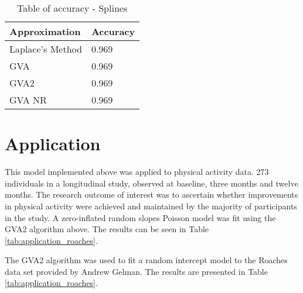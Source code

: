 \documentclass{article}[12pt]
\begin{document}
\begin{table}
\caption{Table of accuracy - Splines}
\label{tab:accuracy_spline}
\begin{tabular}{l|l}
\hline
Approximation & Accuracy \\
\hline
Laplace's Method & 0.969 \\
GVA & 0.969 \\
GVA2 & 0.969 \\
GVA NR & 0.969 \\
\hline
\end{tabular}
\end{table}


\section{Application}\label{sec:application}

This model implemented above was applied to physical activity data.
273 individuals in a longitudinal study, observed at baseline, three months and twelve
months. The research outcome of interest was to ascertain whether improvements in physical
activity were achieved and maintained by the majority of participants in the study.
A zero-inflated random slopes Poisson model was fit using the GVA2 algorithm above.
The results can be seen in Table \ref{tab:application_roaches}.

The GVA2 algorithm was used to fit a random intercept model to the Roaches data set provided
by Andrew Gelman. The results are presented in Table \ref{tab:application_roaches}.


\end{document}
